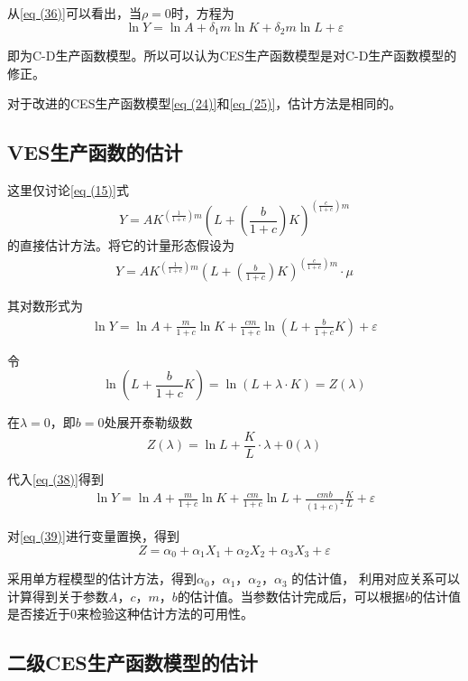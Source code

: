 	从\eqref{eq (36)}可以看出，当$ \rho = 0 $时，方程为
	$$ \ln Y=\ln A+\delta_{1} m \ln K+\delta_{2} m \ln L+\varepsilon $$

	即为C-D生产函数模型。所以可以认为CES生产函数模型是对C-D生产函数模型的修正。
		
	对于改进的CES生产函数模型\eqref{eq (24)}和\eqref{eq (25)}，估计方法是相同的。
		
\subsection{VES生产函数的估计} 
		
	这里仅讨论\eqref{eq (15)}式
	$$ Y=A K^{\left(\frac{1}{1+c}\right) m}\left(L+\left(\frac{b}{1+c}\right) K\right)^{\left(\frac{c}{1+c}\right) m} $$
	的直接估计方法。将它的计量形态假设为
	\begin{align}
		Y=A K^{\left(\frac{1}{1+c}\right) m}\left(L+\left(\frac{b}{1+c}\right) K\right)^{\left(\frac{c}{1+c}\right) m} \cdot \mu \label{eq (37)}
	\end{align}

	其对数形式为
	\begin{align}
		\ln Y=\ln A+\frac{m}{1+c} \ln K+\frac{c m}{1+c} \ln \left(L+\frac{b}{1+c} K\right)+\varepsilon \label{eq (38)}
	\end{align}

	令  
	$$ \ln \left(L+\frac{b}{1+c} K\right)=\ln (L+\lambda \cdot K)=Z(\lambda) $$

	在$ \lambda = 0 $，即$ b=0 $处展开泰勒级数
	$$ Z(\lambda)=\ln L+\frac{K}{L} \cdot \lambda+0(\lambda) $$

	代入\eqref{eq (38)}得到
	\begin{align}
		\ln Y=\ln A+\frac{m}{1+c} \ln K+\frac{c m}{1+c} \ln L+\frac{c m b}{(1+c)^{2}} \frac{K}{L}+\varepsilon  \label{eq (39)}
	\end{align}

	对\eqref{eq (39)}进行变量置换，得到
	$$ Z=\alpha_{0}+\alpha_{1} X_{1}+\alpha_{2} X_{2}+\alpha_{3} X_{3}+\varepsilon $$

	采用单方程模型的估计方法，得到$ \alpha_{0} $，$ \alpha_{1} $，$ \alpha_{2} $，$ \alpha_{3} $ 的估计值，
	利用对应关系可以计算得到关于参数$ A $，$ c $，$ m $，$ b $的估计值。当参数估计完成后，可以根据$ b $的估计值是否接近于0来检验这种估计方法的可用性。
		
\subsection{二级CES生产函数模型的估计}
		
